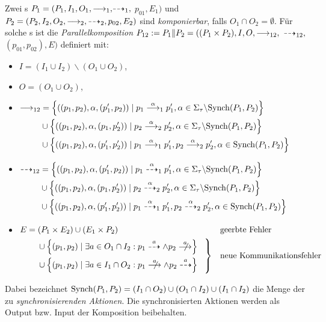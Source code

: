 \begin{Def}[Parallelkomposition]
  Zwei \MEIO{}s $P_1 = (P_1,I_1,O_1,{\must_1,}{\may_1,}$ $p_{01},E_1)$ und $P_2 =
  (P_2,I_2,O_2,\must_2,\may_2,p_{02},E_2)$ sind \emph{komponierbar}, falls
  $O_1\cap O_2=\emptyset$. Für solche \MEIO{}s ist die
  \emph{Parallelkomposition} $P_{12} := P_1\|P_2=((P_1\times P_2), I, O,
  {\must_{12},}$ ${\may_{12},}$ $(p_{01}, p_{02}), E)$ definiert mit:
  \begin{itemize}
    \item $I=(I_1\cup I_2)\backslash (O_1\cup O_2)$,
    \item $O=(O_1\cup O_2)$,
  \item $\begin{aligned}[t]
      \must_{12} & = \left\{\left((p_1,p_2),\alpha,(p_1',p_2)\right) \mid p_1
      \must[\alpha]_1 p_1', \alpha\in\Sigma_{\tau}\backslash
      \Synch(P_1,P_2)\right\}\\
        &\cup \left\{\left((p_1,p_2),\alpha,(p_1,p_2')\right) \mid p_2
      \must[\alpha]_2 p_2', \alpha\in\Sigma_{\tau}\backslash
      \Synch(P_1,P_2)\right\}\\
        &\cup \left\{\left((p_1,p_2),\alpha,(p_1',p_2')\right) \mid p_1
      \must[\alpha]_1 p_1', p_2 \must[\alpha]_2 p_2', \alpha\in
      \Synch(P_1,P_2)\right\}
    \end{aligned}$
  \item $\begin{aligned}[t]
      \may_{12} & = \left\{\left((p_1,p_2),\alpha,(p_1',p_2)\right) \mid p_1
      \may[\alpha]_1 p_1', \alpha\in\Sigma_{\tau}\backslash
      \Synch(P_1,P_2)\right\}\\
        &\cup \left\{\left((p_1,p_2),\alpha,(p_1,p_2')\right) \mid p_2
      \may[\alpha]_2 p_2', \alpha\in\Sigma_{\tau}\backslash
      \Synch(P_1,P_2)\right\}\\
        &\cup \left\{\left((p_1,p_2),\alpha,(p_1',p_2')\right) \mid p_1
      \may[\alpha]_1 p_1', p_2 \may[\alpha]_2 p_2', \alpha\in
      \Synch(P_1,P_2)\right\}
    \end{aligned}$
  \item $\begin{aligned}[t]
      E & = (P_1\times E_2) \cup (E_1\times P_2) &&\text{geerbte Fehler}\\
        &\quad\left. \begin{aligned}
        &\cup \left\{(p_1,p_2) \mid \exists a \in O_1\cap I_2 : p_1
        \may[a]\land p_2\nmust[a]\right\}\\
        &\cup \left\{(p_1,p_2) \mid \exists a\in I_1\cap O_2 :
        p_1\nmust[a]\land p_2\may[a]\right\}
        \end{aligned}\hspace{0.3cm}\right\} &&\text{neue Kommunikationsfehler}
    \end{aligned}$
  \end{itemize}
  Dabei bezeichnet $\mathrm{Synch}(P_1,P_2)=(I_1\cap O_2)\cup (O_1\cap I_2)\cup
  (I_1\cap I_2)$ die Menge der zu \emph{synchronisierenden Aktionen}. Die
  synchronisierten Aktionen werden als Output bzw. Input der Komposition
  beibehalten.
\end{Def}

